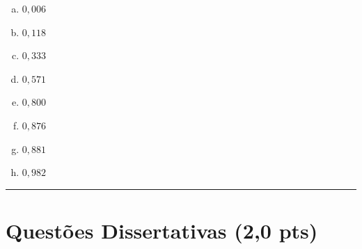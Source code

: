 \documentclass[11pt,a4paper]{article}
\begin{document}
\begin{enumerate}[1)]
\begin{enumerate}[a)]
    \item $0{,}006$
    \item $0{,}118$
    \item $0{,}333$
    \item $0{,}571$
    \item $0{,}800$
    \item $0{,}876$
    \item $0{,}881$
    \item $0{,}982$
\end{enumerate}

\end{enumerate}

\rule{\linewidth}{0.4pt}

\pagebreak
\section*{Questões Dissertativas (2{,}0 pts)}
\end{document}
